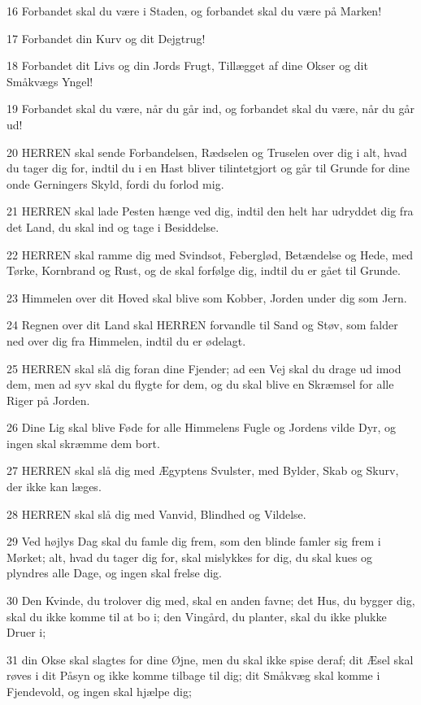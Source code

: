 \par 16 Forbandet skal du være i Staden, og forbandet skal du være på Marken!
\par 17 Forbandet din Kurv og dit Dejgtrug!
\par 18 Forbandet dit Livs og din Jords Frugt, Tillægget af dine Okser og dit Småkvægs Yngel!
\par 19 Forbandet skal du være, når du går ind, og forbandet skal du være, når du går ud!
\par 20 HERREN skal sende Forbandelsen, Rædselen og Truselen over dig i alt, hvad du tager dig for, indtil du i en Hast bliver tilintetgjort og går til Grunde for dine onde Gerningers Skyld, fordi du forlod mig.
\par 21 HERREN skal lade Pesten hænge ved dig, indtil den helt har udryddet dig fra det Land, du skal ind og tage i Besiddelse.
\par 22 HERREN skal ramme dig med Svindsot, Feberglød, Betændelse og Hede, med Tørke, Kornbrand og Rust, og de skal forfølge dig, indtil du er gået til Grunde.
\par 23 Himmelen over dit Hoved skal blive som Kobber, Jorden under dig som Jern.
\par 24 Regnen over dit Land skal HERREN forvandle til Sand og Støv, som falder ned over dig fra Himmelen, indtil du er ødelagt.
\par 25 HERREN skal slå dig foran dine Fjender; ad een Vej skal du drage ud imod dem, men ad syv skal du flygte for dem, og du skal blive en Skræmsel for alle Riger på Jorden.
\par 26 Dine Lig skal blive Føde for alle Himmelens Fugle og Jordens vilde Dyr, og ingen skal skræmme dem bort.
\par 27 HERREN skal slå dig med Ægyptens Svulster, med Bylder, Skab og Skurv, der ikke kan læges.
\par 28 HERREN skal slå dig med Vanvid, Blindhed og Vildelse.
\par 29 Ved højlys Dag skal du famle dig frem, som den blinde famler sig frem i Mørket; alt, hvad du tager dig for, skal mislykkes for dig, du skal kues og plyndres alle Dage, og ingen skal frelse dig.
\par 30 Den Kvinde, du trolover dig med, skal en anden favne; det Hus, du bygger dig, skal du ikke komme til at bo i; den Vingård, du planter, skal du ikke plukke Druer i;
\par 31 din Okse skal slagtes for dine Øjne, men du skal ikke spise deraf; dit Æsel skal røves i dit Påsyn og ikke komme tilbage til dig; dit Småkvæg skal komme i Fjendevold, og ingen skal hjælpe dig;
